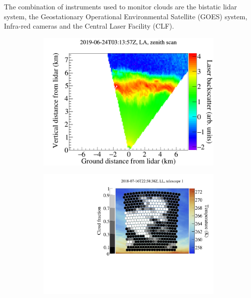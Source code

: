 The combination of instruments used to monitor clouds are the bistatic lidar system, the Geostationary Operational Environmental Satellite (GOES) system, Infra-red cameras and the Central Laser Facility (CLF).

\begin{figure}
\begin{subfigure}[b]{0.3\textwidth}
\includegraphics[width=\textwidth]{chapters/graphs/CloudFlags/lidar_scan.png}
\caption{} \label{subfig:liadr_scan}
\end{subfigure}
\begin{subfigure}[b]{0.3\textwidth}
\includegraphics[width=\textwidth]{chapters/graphs/CloudFlags/ir_cloudfraction_pixels.pdf}
\caption{} \label{subfig:IR_cloudcam}
\end{subfigure}

\end{figure}
